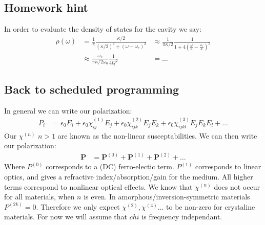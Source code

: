 \subsection*{Homework hint}
In order to evaluate the density of states for the cavity we say:
\begin{align*}
	\rho(\omega) &= \frac{1}{\pi} \frac{\kappa/2}{(\kappa/2)^2 + (\omega - \omega_c)^2}
	&\approx \frac{1}{\pi\kappa/2} \frac{1}{1 + 4\left(\frac{\omega}{\kappa} - \frac{\omega_c}{\kappa}\right)^2} \\
	&\approx \frac{\omega_c}{\pi \kappa/2\omega_0} \frac{1}{4Q^2}
	&= \ldots
\end{align*}
\subsection*{Back to scheduled programming}
In general we can write our polarization:
\begin{align*}
	P_i &= \epsilon_0 E_i + \epsilon_0 \chi^{(1)}_{ij} E_j + \epsilon_0 \chi^{(2)}_{ijk} E_j E_k + \epsilon_0 \chi^{(3)}_{ijkl} E_{j}E_kE_l + \ldots
\end{align*}
Our $\chi^{(n)}$ $n>1$ are known as the non-linear susceptabilities. We can then write our polarization:
\begin{align*}
	\bm{P} &= \bm{P}^{(0)} + \bm{P}^{(1)} + \bm{P}^{(2)} + \ldots
\end{align*}
Where $P^{(0)}$ corresponds to a (DC) ferro-electic term. $P^{(1)}$ corresponds to linear optics, and gives a refractive index/absorption/gain for the medium. All higher terms correspond to nonlinear optical effects.
We know that $\chi^{(n)}$ does not occur for all materials, when $n$ is even. In amorphous/inversion-symmetric materials $P^{(2k)}=0$. Therefore we only expect $\chi^{(2)},\chi^{(4)}\ldots$ to be non-zero for crystaline materials.
For now we will assume that $chi$ is frequency independant.

